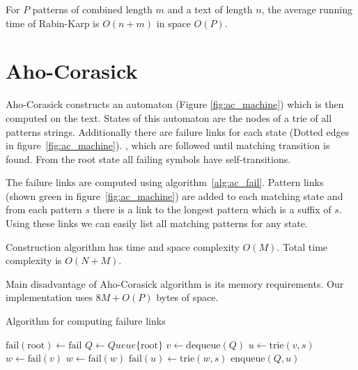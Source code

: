 \documentclass[final]{beamer}
\begin{document}
\begin{poster}
For $P$ patterns of combined length $m$  and a text of length $n$, the average running time of Rabin-Karp is $O(n+m)$ in space $O(P)$.


\section{Aho-Corasick}

Aho-Corasick constructs an automaton (Figure \ref{fig:ac_machine}) which is then computed on the text.
States of this automaton are the nodes of a trie of all patterns strings.
Additionally there are failure links for each state (Dotted edges in figure~\ref{fig:ac_machine}).
, which are followed until matching transition is found. From the root state all failing symbols
have self-transitions.


The failure links are computed using algorithm~\ref{alg:ac_fail}.
Pattern links (shown green in figure~\ref{fig:ac_machine}) are added to each
matching state and from each pattern $s$ there is a link to the longest pattern which
is a suffix of $s$.
Using these links we can easily list all matching patterns for
any state.
\newcolumn

Construction algorithm has time and space complexity $O(M)$. Total time complexity is $O(N+M)$.

Main disadvantage of Aho-Corasick algorithm is its memory requirements.
Our implementation uses $8M+O(P)$ bytes of space.

\vspace{5mm}

\begin{algorithm} [H]
\small
\caption{Algorithm for computing failure links}
\label{alg:ac_fail}

\begin{algorithmic}[1]
\State $ \text{fail}(\text{root}) \gets \text{fail}$
\State $Q \gets Queue\{\text{root}\}$
    \State $v \gets \text{dequeue}(Q) $
        \State $u \gets \text{trie}(v,s)$ 
        \State $w \gets \text{fail}(v)$ 
            \State $w \gets \text{fail}(w)$ 
        \EndWhile
        \State $ \text{fail}(u) \gets \text{trie}(w,s)$
        \State $\text{enqueue}(Q,u)$
    \EndFor
\EndWhile
\end{algorithmic}
\end{algorithm}


\end{poster}
\end{document}
